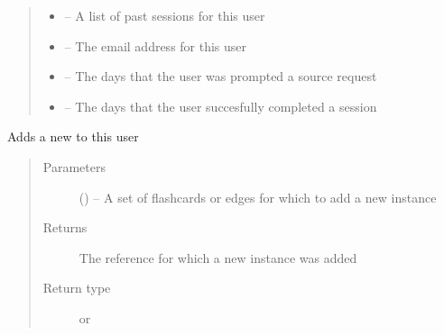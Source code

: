 \documentclass[letterpaper,10pt,english]{sphinxmanual}
\begin{document}
\begin{fulllineitems}
\begin{quote}
\begin{description}
\begin{itemize}
\item {} 
 -- A list of past sessions for this user

\item {} 
\href{https://docs.python.org/2/library/email.html\#module-email}{} -- The email address for this user

\item {} 
 -- The days that the user was prompted a source request

\item {} 
 -- The days that the user succesfully completed a session

\end{itemize}

\end{description}\end{quote}

\begin{fulllineitems}
\label{\detokenize{user:user.User.add_new_instance}}
Adds a new  to this user
\begin{quote}\begin{description}
\item[{Parameters}] \leavevmode
{} (\href{https://docs.python.org/2/library/functions.html\#list}{}\sphinxstyleliteralemphasis{)}\sphinxstyleliteralemphasis{}) -- A set of flashcards or edges for which to add a new instance

\item[{Returns}] \leavevmode
The reference for which a new instance was added

\item[{Return type}] \leavevmode
{\hyperref[\detokenize{flashcard:flashcard.Flashcard}]{}} or {\hyperref[\detokenize{edge:edge.Edge}]{}}

\end{description}\end{quote}


\end{fulllineitems}
\end{fulllineitems}
\end{document}
